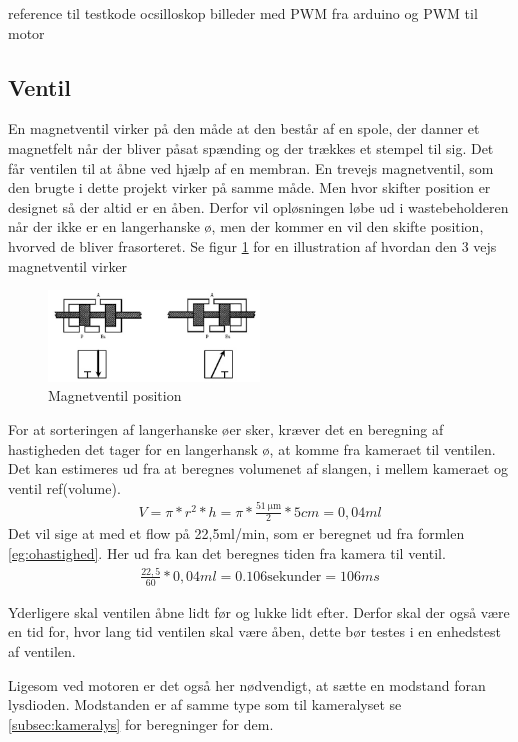 reference til testkode
ocsilloskop billeder med PWM fra arduino og PWM til motor



 \subsection{Ventil}
 En magnetventil virker på den måde at den består af en spole, der danner et magnetfelt når der bliver påsat spænding og der trækkes et stempel til sig. Det får ventilen til at åbne ved hjælp af en membran. En trevejs magnetventil, som den brugte i dette projekt virker på samme måde. Men hvor skifter position er designet så der altid er en åben. Derfor vil opløsningen løbe ud i wastebeholderen når der ikke er en langerhanske ø, men der kommer en vil den skifte position, hvorved de bliver frasorteret. Se figur \ref{fig:ventilpos} for en illustration af hvordan den 3 vejs magnetventil virker

\begin{figure}[H]
	\centering
	\includegraphics[width=0.5\textwidth]{billeder/Hardware/ventil.png}
	\caption{Magnetventil position}
	\label{fig:ventilpos}
\end{figure}  
For at sorteringen af langerhanske øer sker, kræver det en beregning af hastigheden det tager for en langerhansk ø, at komme fra kameraet til ventilen. Det kan estimeres ud fra at beregnes volumenet af slangen, i mellem kameraet og ventil ref(volume).
\begin{align}
V=\pi*r^2*h=\pi*\frac{\SI{51}{\micro\metre}}{2}*5cm=0,04ml
\end{align}
 Det vil sige at med et flow på 22,5ml/min, som er beregnet ud fra formlen \ref{eg:ohastighed}. Her ud fra kan det beregnes tiden fra kamera til ventil. 
 \begin{align}
\frac{22,5}{60}*0,04ml=0.106\text{sekunder}=106ms
\end{align}

Yderligere skal ventilen åbne lidt før og lukke lidt efter. Derfor skal der også være en tid for, hvor lang tid ventilen skal være åben, dette bør testes i en enhedstest af ventilen.

Ligesom ved motoren er det også her nødvendigt, at sætte en modstand foran lysdioden. Modstanden er af samme type som til kameralyset se \ref{subsec:kameralys} for beregninger for dem. 

